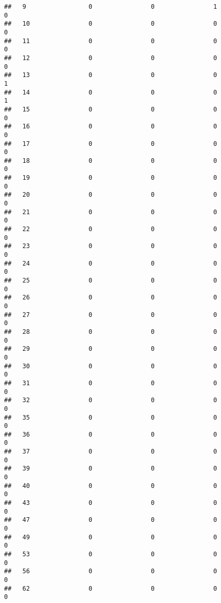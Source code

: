 \documentclass[]{article}
\begin{document}
\begin{verbatim}
##   9                 0                0                1                0
##   10                0                0                0                0
##   11                0                0                0                0
##   12                0                0                0                0
##   13                0                0                0                1
##   14                0                0                0                1
##   15                0                0                0                0
##   16                0                0                0                0
##   17                0                0                0                0
##   18                0                0                0                0
##   19                0                0                0                0
##   20                0                0                0                0
##   21                0                0                0                0
##   22                0                0                0                0
##   23                0                0                0                0
##   24                0                0                0                0
##   25                0                0                0                0
##   26                0                0                0                0
##   27                0                0                0                0
##   28                0                0                0                0
##   29                0                0                0                0
##   30                0                0                0                0
##   31                0                0                0                0
##   32                0                0                0                0
##   35                0                0                0                0
##   36                0                0                0                0
##   37                0                0                0                0
##   39                0                0                0                0
##   40                0                0                0                0
##   43                0                0                0                0
##   47                0                0                0                0
##   49                0                0                0                0
##   53                0                0                0                0
##   56                0                0                0                0
##   62                0                0                0                0

\end{verbatim}
\end{document}
